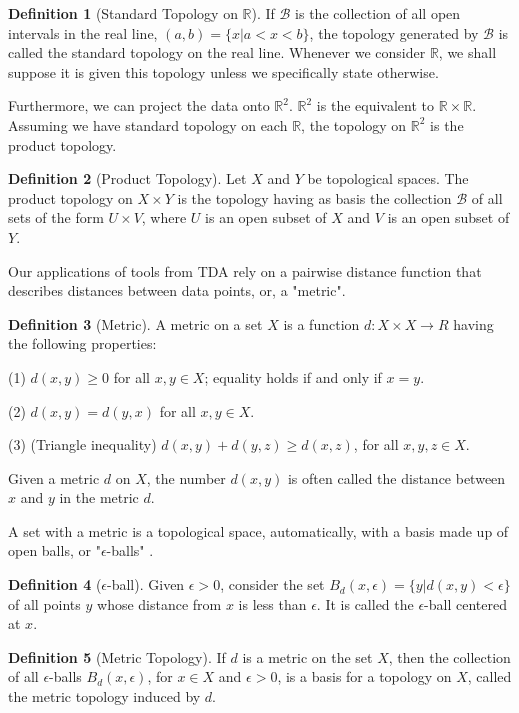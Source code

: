 \documentclass[12pt]{article}
\theoremstyle{definition}
\newtheorem{definition}{Definition}
\begin{document}
\begin{definition}[Standard Topology on $\mathbb{R}$]
If $\mathcal{B}$ is the collection of all open intervals in the real line, $(a, b) = \{x | a < x < b\}$, the topology generated by $\mathcal{B}$ is called the standard topology on the real line. Whenever we consider $\mathbb{R}$, we shall suppose it is given this topology unless we specifically state otherwise.
\end{definition}

Furthermore, we can project the data onto $\mathbb{R}^2$. $\mathbb{R}^2$ is the equivalent to $\mathbb{R} \times \mathbb{R}$. Assuming we have standard topology on each $\mathbb{R}$, the topology on $\mathbb{R}^2$ is the product topology.

\begin{definition}[Product Topology]
Let $X$ and $Y$ be topological spaces. The product topology on $X \times Y$ is the topology having as basis the collection $\mathcal{B}$ of all sets of the form $U \times V$, where $U$ is an open subset of $X$ and $V$ is an open subset of $Y$.
\end{definition}
Our applications of tools from TDA rely on a pairwise distance function that describes distances between data points, or, a "metric".
\begin{definition}[Metric]
A metric on a set $X$ is a function $d: X \times X \rightarrow R$ having the following properties:

(1) $d(x, y) \geq 0$ for all $x, y \in X$; equality holds if and only if $x=y$.

(2) $d(x, y) = d(y, x)$ for all $x, y \in X$.

(3) (Triangle inequality) $d(x, y) + d(y, z) \geq d(x, z)$, for all $x, y, z \in X$.

Given a metric $d$ on $X$, the number $d(x, y)$ is often called the distance between $x$ and $y$ in the metric $d$.
\end{definition}
A set with a metric is a topological space, automatically, with a basis made up of open balls, or "$\epsilon$-balls" \cite{munkres2000topology}.
\begin{definition}[$\epsilon$-ball]
Given $\epsilon > 0$, consider the set $B_d(x, \epsilon) = \{y | d(x, y) < \epsilon \}$ of all points $y$ whose distance from $x$ is less than $\epsilon$. It is called the $\epsilon$-ball centered at $x$.
\end{definition}

\begin{definition}[Metric Topology]
If $d$ is a metric on the set $X$, then the collection of all $\epsilon$-balls $B_d(x, \epsilon)$, for $x \in X$ and $\epsilon > 0$, is a basis for a topology on $X$, called the metric topology induced by $d$.
\end{definition}
\end{document}
